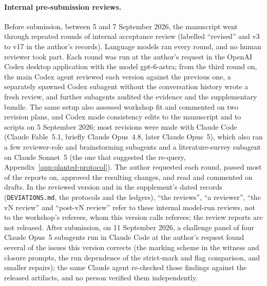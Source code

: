\paragraph{Internal pre-submission reviews.} Before submission, between 5 and 7 September 2026, the manuscript went through repeated rounds of internal acceptance review (labelled ``revised'' and v3 to v17 in the author's records). Language models ran every round, and no human reviewer took part. Each round was run at the author's request in the OpenAI Codex desktop application with the model gpt-6-astra; from the third round on, the main Codex agent reviewed each version against the previous one, a separately spawned Codex subagent without the conversation history wrote a fresh review, and further subagents audited the evidence and the supplementary bundle. The same setup also assessed workshop fit and commented on two revision plans, and Codex made consistency edits to the manuscript and to scripts on 5 September 2026; most revisions were made with Claude Code (Claude Fable~5.1, briefly Claude Opus~4.8, later Claude Opus~5), which also ran a few reviewer-role and brainstorming subagents and a literature-survey subagent on Claude Sonnet~5 (the one that suggested the re-query, Appendix~\ref{app:planted-protocol}). The author requested each round, passed most of the reports on, approved the resulting changes, and read and commented on drafts. In the reviewed version and in the supplement's dated records (\texttt{DEVIATIONS.md}, the protocols and the ledgers), ``the reviews'', ``a reviewer'', ``the vN review'' and ``post-vN review'' refer to these internal model-run reviews, not to the workshop's referees, whom this version calls referees; the review reports are not released. After submission, on 11 September 2026, a challenge panel of four Claude Opus~5 subagents run in Claude Code at the author's request found several of the issues this version corrects (the marking scheme in the witness and closure prompts, the run dependence of the strict-mark and flag comparison, and smaller repairs); the same Claude agent re-checked those findings against the released artifacts, and no person verified them independently.

